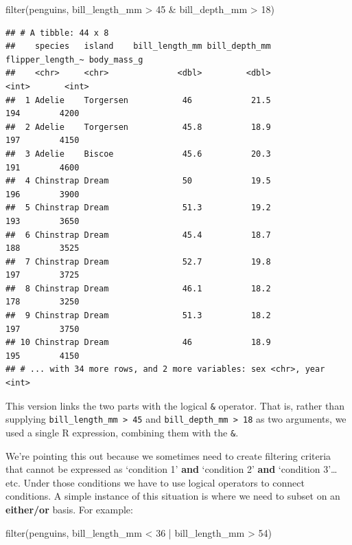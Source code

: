 \documentclass[
]{book}
\newenvironment{Shaded}{\begin{snugshade}}{\end{snugshade}}
\newcommand{\DecValTok}[1]{\textcolor[rgb]{0.00,0.00,0.81}{#1}}
\newcommand{\FunctionTok}[1]{\textcolor[rgb]{0.00,0.00,0.00}{#1}}
\newcommand{\NormalTok}[1]{#1}
\newcommand{\SpecialCharTok}[1]{\textcolor[rgb]{0.00,0.00,0.00}{#1}}
\begin{document}
\begin{Shaded}
\begin{Highlighting}[]
\FunctionTok{filter}\NormalTok{(penguins, bill\_length\_mm }\SpecialCharTok{\textgreater{}} \DecValTok{45} \SpecialCharTok{\&}\NormalTok{ bill\_depth\_mm }\SpecialCharTok{\textgreater{}} \DecValTok{18}\NormalTok{)}
\end{Highlighting}
\end{Shaded}

\begin{verbatim}
## # A tibble: 44 x 8
##    species   island    bill_length_mm bill_depth_mm flipper_length_~ body_mass_g
##    <chr>     <chr>              <dbl>         <dbl>            <int>       <int>
##  1 Adelie    Torgersen           46            21.5              194        4200
##  2 Adelie    Torgersen           45.8          18.9              197        4150
##  3 Adelie    Biscoe              45.6          20.3              191        4600
##  4 Chinstrap Dream               50            19.5              196        3900
##  5 Chinstrap Dream               51.3          19.2              193        3650
##  6 Chinstrap Dream               45.4          18.7              188        3525
##  7 Chinstrap Dream               52.7          19.8              197        3725
##  8 Chinstrap Dream               46.1          18.2              178        3250
##  9 Chinstrap Dream               51.3          18.2              197        3750
## 10 Chinstrap Dream               46            18.9              195        4150
## # ... with 34 more rows, and 2 more variables: sex <chr>, year <int>
\end{verbatim}

This version links the two parts with the logical \texttt{\&} operator. That is, rather than supplying \texttt{bill\_length\_mm\ \textgreater{}\ 45} and \texttt{bill\_depth\_mm\ \textgreater{}\ 18} as two arguments, we used a single R expression, combining them with the \texttt{\&}.

We're pointing this out because we sometimes need to create filtering criteria that cannot be expressed as `condition 1' \textbf{and} `condition 2' \textbf{and} `condition 3'\ldots{} etc. Under those conditions we have to use logical operators to connect conditions. A simple instance of this situation is where we need to subset on an \textbf{either/or} basis. For example:

\begin{Shaded}
\begin{Highlighting}[]
\FunctionTok{filter}\NormalTok{(penguins, bill\_length\_mm }\SpecialCharTok{\textless{}} \DecValTok{36} \SpecialCharTok{|}\NormalTok{ bill\_length\_mm }\SpecialCharTok{\textgreater{}} \DecValTok{54}\NormalTok{)}
\end{Highlighting}
\end{Shaded}
\end{document}
